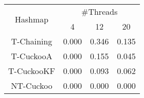 \begin{tabular}{|c|c|c|c|}
\hline
\multirow{2}{*}{Hashmap} & \multicolumn{3}{c|}{\#Threads}\\\cline{2-4}& 4 & 12 & 20\\
\hline
\hline
T-Chaining & 0.000 & 0.346 & 0.135\\
T-CuckooA & 0.000 & 0.155 & 0.045\\
T-CuckooKF & 0.000 & 0.093 & 0.062\\
NT-Cuckoo & 0.000 & 0.000 & 0.000\\
\hline
\end{tabular}
